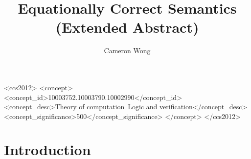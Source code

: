 \documentclass[manuscript,screen,review,sigplan]{acmart}
\begin{document}
\title{Equationally Correct Semantics (Extended Abstract)}

\author{Cameron Wong}

\renewcommand{\shortauthors}{Wong}

\newcommand{\N}{\mathbb{N}}

\begin{CCSXML}
<ccs2012>
<concept>
<concept_id>10003752.10003790.10002990</concept_id>
<concept_desc>Theory of computation~Logic and verification</concept_desc>
<concept_significance>500</concept_significance>
</concept>
</ccs2012>
\end{CCSXML}


\maketitle

\section{Introduction}

\end{document}
